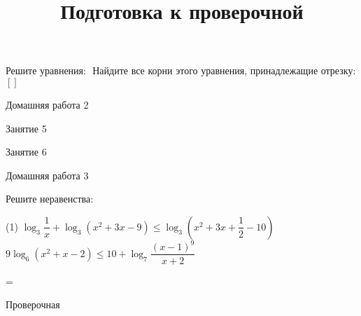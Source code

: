 \begin{class}[number=4]
	\begin{listofex}
		\item 
		\begin{tasks}
			\task Решите уравнения: \(  \)
			\task Найдите все корни этого уравнения, принадлежащие отрезку: \( \left[  \right]  \)
		\end{tasks}
	\end{listofex}
\end{class}

\begin{homework}[number=2]
	\begin{listofex}
		\item Домашняя работа 2
	\end{listofex}
\end{homework}

\begin{class}[number=5]
	\begin{listofex}
		\item Занятие 5
	\end{listofex}
\end{class}

\begin{class}[number=6]
	\begin{listofex}
		\item Занятие 6
	\end{listofex}
\end{class}

\begin{homework}[number=3]
	\begin{listofex}
		\item Домашняя работа 3
	\end{listofex}
\end{homework}

\begin{class}[number=7]
	\title{Подготовка к проверочной}
	\begin{listofex}
		\item Решите неравенства:
	\begin{tasks}(1)
		\task \( \log_3 \dfrac{1}{x} + \log_3 (x^2+3x-9) \le \log_3 \left( x^2+3x+\dfrac{1}{2}-10 \right)  \)
		\task \( 9\log_6 (x^2+x-2) \le 10 + \log_7 \dfrac{(x-1)^9}{x+2} \)
	\end{tasks}
	\end{listofex}
\end{class}

=%
\begin{exam}
	\begin{listofex}
		\item Проверочная
	\end{listofex}
\end{exam}
